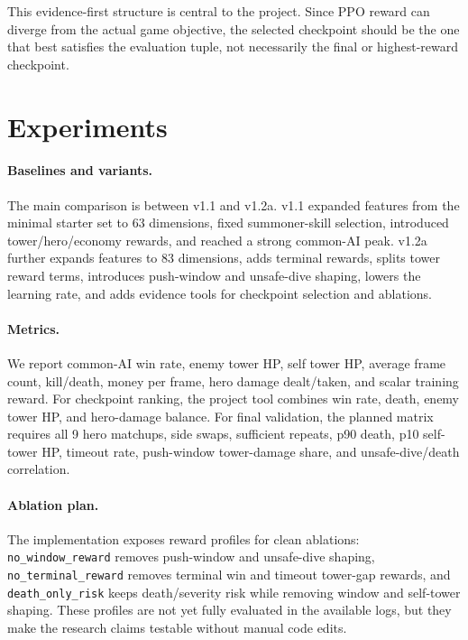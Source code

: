 \documentclass{article}
\begin{document}
This evidence-first structure is central to the project. Since PPO reward can diverge from the actual game objective, the selected checkpoint should be the one that best satisfies the evaluation tuple, not necessarily the final or highest-reward checkpoint.

\section{Experiments}

\paragraph{Baselines and variants.}
The main comparison is between v1.1 and v1.2a. v1.1 expanded features from the minimal starter set to 63 dimensions, fixed summoner-skill selection, introduced tower/hero/economy rewards, and reached a strong common-AI peak. v1.2a further expands features to 83 dimensions, adds terminal rewards, splits tower reward terms, introduces push-window and unsafe-dive shaping, lowers the learning rate, and adds evidence tools for checkpoint selection and ablations.

\paragraph{Metrics.}
We report common-AI win rate, enemy tower HP, self tower HP, average frame count, kill/death, money per frame, hero damage dealt/taken, and scalar training reward. For checkpoint ranking, the project tool combines win rate, death, enemy tower HP, and hero-damage balance. For final validation, the planned matrix requires all 9 hero matchups, side swaps, sufficient repeats, p90 death, p10 self-tower HP, timeout rate, push-window tower-damage share, and unsafe-dive/death correlation.

\paragraph{Ablation plan.}
The implementation exposes reward profiles for clean ablations: \texttt{no\_window\_reward} removes push-window and unsafe-dive shaping, \texttt{no\_terminal\_reward} removes terminal win and timeout tower-gap rewards, and \texttt{death\_only\_risk} keeps death/severity risk while removing window and self-tower shaping. These profiles are not yet fully evaluated in the available logs, but they make the research claims testable without manual code edits.
\end{document}
